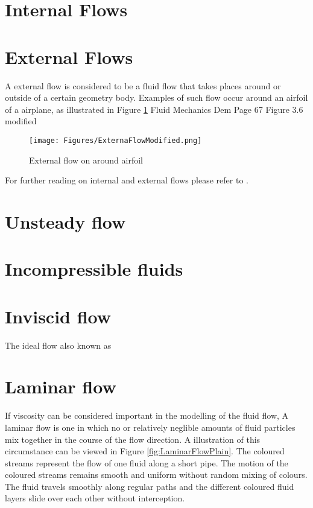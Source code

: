\section{Internal Flows}

\section{External Flows}
A external flow is considered to be a fluid flow that takes places around or outside of a certain geometry body. Examples of such flow occur around
an airfoil of a airplane, as illustrated in Figure \ref{fig:ExternalFlowAirfoil}  Fluid Mechanics Dem Page 67 Figure 3.6 modified


\begin{figure}[htp]
\centering
\texttt{[image: Figures/ExternaFlowModified.png]}
\caption{External flow on around airfoil}
\label{fig:ExternalFlowAirfoil}
\end{figure}

For further reading on internal and external flows please refer to \cite{Hirsch2007}.

\section{Unsteady flow}


\section{Incompressible fluids}
\label{sec:incompress_fluid}



\section{Inviscid flow}
\label{sec:invisicid_flow}
The ideal flow also known as



\section{Laminar flow}

If viscosity can be considered important in the modelling of the fluid flow, 
A laminar flow is one in which no or relatively neglible amounts of fluid particles mix together in the course of the flow direction. A illustration
of this circumstance can be viewed in Figure \ref{fig:LaminarFlowPlain}. The coloured streams represent the flow of one fluid along a short pipe. The motion
of the coloured streams remains smooth and uniform without random mixing of colours. The fluid travels smoothly along regular paths and the different coloured
fluid layers slide over each other without interception.


